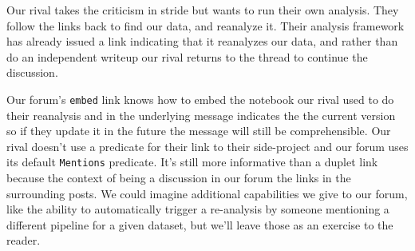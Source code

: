 \begin{Shaded}
\begin{Highlighting}[]




\end{Highlighting}
\end{Shaded}

Our rival takes the criticism in stride but wants to run their own
analysis. They follow the links back to find our data, and reanalyze it.
Their analysis framework has already issued a link indicating that it
reanalyzes our data, and rather than do an independent writeup our rival
returns to the thread to continue the discussion.

\begin{Shaded}
\begin{Highlighting}[]



\end{Highlighting}
\end{Shaded}

Our forum's \texttt{embed} link knows how to embed the notebook our
rival used to do their reanalysis and in the underlying message
indicates the the current version so if they update it in the future the
message will still be comprehensible. Our rival doesn't use a predicate
for their link to their side-project and our forum uses its default
\texttt{Mentions} predicate. It's still more informative than a duplet
link because the context of being a discussion in our forum the links in
the surrounding posts. We could imagine additional capabilities we give
to our forum, like the ability to automatically trigger a re-analysis by
someone mentioning a different pipeline for a given dataset, but we'll
leave those as an exercise to the reader.

